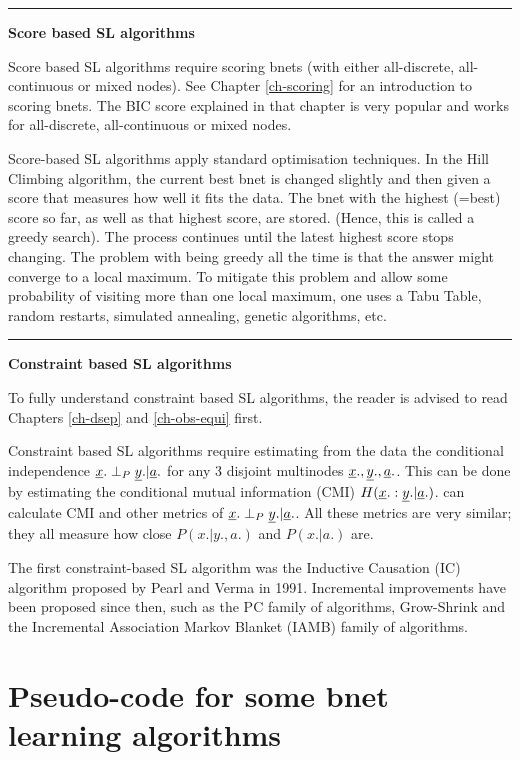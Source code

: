 \hrule\noindent
{\bf Score based SL algorithms}

Score based SL algorithms
require
scoring bnets (with either
all-discrete, all-continuous
or mixed nodes).
See Chapter \ref{ch-scoring}
for an introduction
to scoring bnets.
The BIC score
explained
in that chapter is
very popular
and works for all-discrete,
all-continuous or mixed nodes.

Score-based SL algorithms apply
standard
optimisation techniques. 
In the Hill Climbing algorithm,
the current best
bnet is changed
slightly
and then given a score
that measures how well
it fits the data.
The bnet with the highest (=best) 
score so far, as well as that highest score,
are stored. (Hence,
this is called a greedy search).
The process continues
until the latest highest score stops changing.
The problem with being
greedy all the time is that
the answer might
converge to a local maximum.
To mitigate
this problem
and allow some
probability of visiting more
than one
local maximum, one uses a
Tabu Table, random restarts,
simulated annealing, genetic algorithms,
etc.

\hrule\noindent
{\bf Constraint based SL algorithms}

To fully understand
 constraint based SL 
algorithms,
the reader 
is advised to read Chapters 
\ref{ch-dsep} and \ref{ch-obs-equi}
first.

Constraint based SL algorithms
require
estimating from the data
the conditional independence
${\underline{x}}.\perp_P {\underline{y}}.|{\underline{a}}.$ 
for any 3 disjoint
multinodes ${\underline{x}}., {\underline{y}}., {\underline{a}}.$.
This can be done by
estimating the conditional
mutual information (CMI)
$H({\underline{x}}.:{\underline{y}}.|{\underline{a}}.)$.
\bnlearn  can calculate CMI and
other metrics
of ${\underline{x}}.\perp_P {\underline{y}}.|{\underline{a}}.$.
All these metrics are very
similar; they 
all measure
how close
$P(x.|y., a.)$
and $P(x.|a.)$ are.

The first
constraint-based SL algorithm
was the Inductive Causation (IC) algorithm
 proposed by Pearl and Verma in 1991.
Incremental
improvements
have been
proposed since then, such as
the PC family
of algorithms,
Grow-Shrink and
the
Incremental Association Markov Blanket (IAMB)
family of algorithms.

\newpage
\section*{Pseudo-code 
for some bnet learning algorithms}







